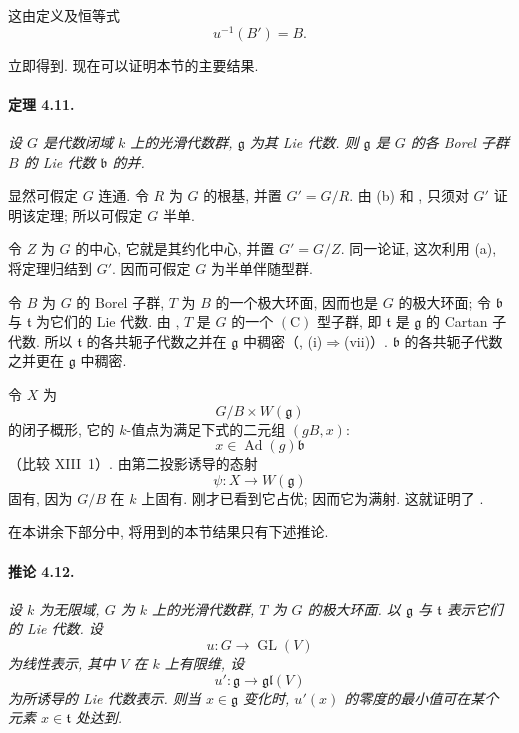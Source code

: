 这由定义及恒等式
\[
  u^{-1}(B')=B.
\]

立即得到. 现在可以证明本节的主要结果.



\paragraph{\textbf{定理 4.11.}}
{\itshape 设 \(G\) 是代数闭域 \(k\) 上的光滑代数群, \(\mathfrak g\) 为其 Lie 代数. 则 \(\mathfrak g\) 是 \(G\) 的各 Borel 子群 \(B\) 的 Lie 代数 \(\mathfrak b\) 的并.}

显然可假定 \(G\) 连通. 令 \(R\) 为 \(G\) 的根基, 并置 \(G'=G/R\). 由 \textup{(b)} 和 , 只须对 \(G'\) 证明该定理; 所以可假定 \(G\) 半单.

令 \(Z\) 为 \(G\) 的中心, 它就是其约化中心, 并置 \(G'=G/Z\). 同一论证, 这次利用 \textup{(a)}, 将定理归结到 \(G'\). 因而可假定 \(G\) 为半单伴随型群.

令 \(B\) 为 \(G\) 的 Borel 子群, \(T\) 为 \(B\) 的一个极大环面, 因而也是 \(G\) 的极大环面; 令 \(\mathfrak b\) 与 \(\mathfrak t\) 为它们的 Lie 代数. 由 , \(T\) 是 \(G\) 的一个 \((\mathrm C)\) 型子群, 即 \(\mathfrak t\) 是 \(\mathfrak g\) 的 Cartan 子代数. 所以 \(\mathfrak t\) 的各共轭子代数之并在 \(\mathfrak g\) 中稠密\textup{（, \textup{(i)}\(\Rightarrow\)\textup{(vii)}）}. \(\mathfrak b\) 的各共轭子代数之并更在 \(\mathfrak g\) 中稠密.

令 \(X\) 为
\[
  G/B\times W(\mathfrak g)
\]
的闭子概形, 它的 \(k\)-值点为满足下式的二元组 \((gB,x)\):
\[
  x\in\operatorname{Ad}(g)\mathfrak b
\]
\textup{（比较 XIII~1）}. 由第二投影诱导的态射
\[
  \psi\colon X\longrightarrow W(\mathfrak g)
\]
固有, 因为 \(G/B\) 在 \(k\) 上固有. 刚才已看到它占优; 因而它为满射. 这就证明了 .

在本讲余下部分中, 将用到的本节结果只有下述推论.

\paragraph{\textbf{推论 4.12.}}
{\itshape 设 \(k\) 为无限域, \(G\) 为 \(k\) 上的光滑代数群, \(T\) 为 \(G\) 的极大环面. 以 \(\mathfrak g\) 与 \(\mathfrak t\) 表示它们的 Lie 代数. 设
\[
  u\colon G\longrightarrow\operatorname{GL}(V)
\]
为线性表示, 其中 \(V\) 在 \(k\) 上有限维, 设
\[
  u'\colon\mathfrak g\longrightarrow\mathfrak{gl}(V)
\]
为所诱导的 Lie 代数表示. 则当 \(x\in\mathfrak g\) 变化时, \(u'(x)\) 的零度的最小值可在某个元素 \(x\in\mathfrak t\) 处达到.}

